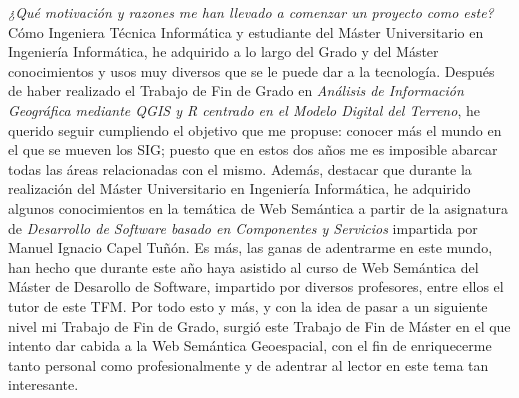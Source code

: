 
\textit{¿Qué motivación y razones me han llevado a comenzar un proyecto como este?} Cómo Ingeniera Técnica Informática y estudiante del Máster Universitario en Ingeniería Informática, he adquirido a lo largo del Grado y del Máster conocimientos y usos muy diversos que se le puede dar a la tecnología. Después de haber realizado el Trabajo de Fin de Grado en \textit{Análisis de Información Geográfica mediante QGIS y R centrado en el Modelo Digital del Terreno}, he querido seguir cumpliendo el objetivo que me propuse: conocer más el mundo en el que se mueven los SIG; puesto que en estos dos años me es imposible abarcar todas las áreas relacionadas con el mismo. Además, destacar que durante la realización del Máster Universitario en Ingeniería Informática, he adquirido algunos conocimientos en la temática de Web Semántica a partir de la asignatura de \textit{Desarrollo de Software basado en Componentes y Servicios} impartida por Manuel Ignacio Capel Tuñón. Es más, las ganas de adentrarme en este mundo, han hecho que durante este año haya asistido al curso de Web Semántica del Máster de Desarollo de Software, impartido por diversos profesores, entre ellos el tutor de este TFM. Por todo esto y más, y con la idea de pasar a un siguiente nivel mi Trabajo de Fin de Grado, surgió este Trabajo de Fin de Máster en el que intento dar cabida a la Web Semántica Geoespacial, con el fin de enriquecerme tanto personal como profesionalmente y de adentrar al lector en este tema tan interesante.\\ 



